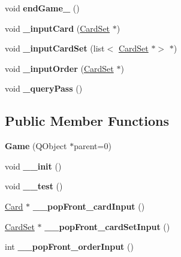\begin{DoxyCompactItemize}
void {\bfseries end\+Game\+\_\+} ()
\item 
\mbox{\label{class_game_a68434e8fd97ea4ced1b66800f6f28cba}} 
void {\bfseries \+\_\+input\+Card} (\hyperlink{class_card_set}{Card\+Set} $\ast$)
\item 
\mbox{\label{class_game_ad05a31ab4777b0dc195a58c9451002de}} 
void {\bfseries \+\_\+input\+Card\+Set} (list$<$ \hyperlink{class_card_set}{Card\+Set} $\ast$$>$ $\ast$)
\item 
\mbox{\label{class_game_a9684a513c8de2ce34f918925d6db5152}} 
void {\bfseries \+\_\+input\+Order} (\hyperlink{class_card_set}{Card\+Set} $\ast$)
\item 
\mbox{\label{class_game_a51f8b19c1fbadff3bb6110a0838f41d1}} 
void {\bfseries \+\_\+query\+Pass} ()
\end{DoxyCompactItemize}
\subsection*{Public Member Functions}
\begin{DoxyCompactItemize}
\item 
\mbox{\label{class_game_a1875963fc898101a29d47084aebffa28}} 
{\bfseries Game} (Q\+Object $\ast$parent=0)
\item 
\mbox{\label{class_game_a3ff63bc03af3e579bada089f42d0c133}} 
void {\bfseries \+\_\+\+\_\+init} ()
\item 
\mbox{\label{class_game_ae5cfc450417808cdcb76cf48c8ff072a}} 
void {\bfseries \+\_\+\+\_\+test} ()
\item 
\mbox{\label{class_game_ae631dec4007607be119441ee2a8baa26}} 
\hyperlink{class_card}{Card} $\ast$ {\bfseries \+\_\+\+\_\+pop\+Front\+\_\+card\+Input} ()
\item 
\mbox{\label{class_game_ac2b080efeb6aab8aa7d176f2fa051a5e}} 
\hyperlink{class_card_set}{Card\+Set} $\ast$ {\bfseries \+\_\+\+\_\+pop\+Front\+\_\+card\+Set\+Input} ()
\item 
\mbox{\label{class_game_a3735b6e5a4c2c08058e748962e01413f}} 
int {\bfseries \+\_\+\+\_\+pop\+Front\+\_\+order\+Input} ()
\end{DoxyCompactItemize}
